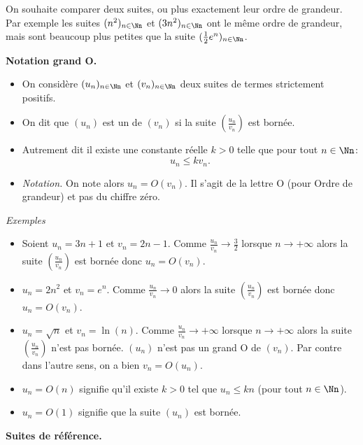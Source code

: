 \documentclass[11pt,class=report,crop=false]{standalone}
\begin{document}
\begin{cours}
On souhaite comparer deux suites, ou plus exactement leur ordre de grandeur. Par exemple les suites $(n^2)_{n\in\Nn}$ et $(3n^2)_{n\in\Nn}$ ont le même ordre de grandeur, mais sont beaucoup plus petites que la suite $(\frac12 e^n)_{n\in\Nn}$. 

\textbf{Notation \og{}grand O\fg{}.}
\begin{itemize}
	\item On considère $(u_n)_{n\in\Nn}$ et $(v_n)_{n\in\Nn}$ deux suites de termes strictement positifs.
	\item On dit que $(u_n)$ est un  de $(v_n)$ si la suite $\left(\frac{u_n}{v_n}\right)$ est bornée.
    \item Autrement dit il existe une constante réelle $k>0$ telle que pour tout $n\in \Nn$:
$$u_n \le k v_n.$$
    \item \emph{Notation.} On note alors $u_n = O(v_n)$. Il s'agit de la lettre \og{}O\fg{} (pour Ordre de grandeur) et pas du chiffre zéro.
\end{itemize}

\emph{Exemples} 
\begin{itemize}
	\item Soient $u_n = 3n+1$ et $v_n = 2n-1$. Comme $\frac{u_n}{v_n} \to \frac{3}{2}$ lorsque $n\to+\infty$ alors la suite $\left(\frac{u_n}{v_n}\right)$ est bornée donc $u_n = O(v_n)$.
	
	\item $u_n = 2n^2$ et $v_n = e^n$. Comme $\frac{u_n}{v_n} \to 0$ alors la suite $\left(\frac{u_n}{v_n}\right)$ est bornée donc $u_n = O(v_n)$. 
	
	\item $u_n = \sqrt{n}$ et $v_n = \ln(n)$. Comme $\frac{u_n}{v_n} \to +\infty$ lorsque $n\to+\infty$ alors la suite $\left(\frac{u_n}{v_n}\right)$ n'est pas bornée.  $(u_n)$ n'est pas un grand O de $(v_n)$.  Par contre dans l'autre sens, on a bien $v_n = O(u_n)$.
	
	\item $u_n = O(n)$ signifie qu'il existe $k>0$ tel que $u_n \le kn$ (pour tout $n\in\Nn$).
	
	\item $u_n = O(1)$ signifie que la suite $(u_n)$ est bornée.
		
\end{itemize}

\bigskip

\textbf{Suites de référence.}


\end{cours}
\end{document}
